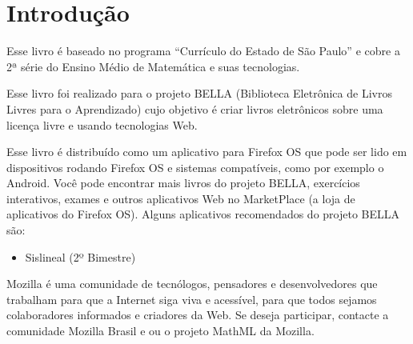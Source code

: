 \section*{Introdução}

Esse livro é baseado no programa ``Currículo do Estado de São Paulo''
e cobre a 2ª série do Ensino Médio de Matemática e suas tecnologias.

Esse livro foi realizado para o projeto BELLA
(Biblioteca Eletrônica de Livros Livres para o Aprendizado) cujo objetivo
é criar livros eletrônicos sobre uma licença livre e usando tecnologias Web.

Esse livro é distribuído como um aplicativo para Firefox OS que pode ser lido em
dispositivos rodando Firefox OS e sistemas compatíveis, como por exemplo o
Android. Você pode encontrar mais livros do projeto BELLA, exercícios
interativos, exames e outros aplicativos Web no MarketPlace (a loja de
aplicativos do Firefox OS). Alguns aplicativos recomendados do projeto BELLA
são:

\begin{itemize}
\item Sislineal (2º Bimestre)
\end{itemize}

Mozilla é uma comunidade de tecnólogos, pensadores e desenvolvedores que
trabalham para que a Internet siga viva e acessível, para que todos sejamos
colaboradores informados e criadores da Web. Se deseja participar, contacte a
comunidade Mozilla Brasil e ou o projeto MathML da Mozilla.
